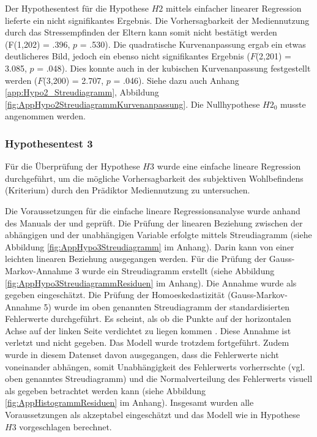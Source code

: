 Der Hypothesentest für die Hypothese $H2$ mittels einfacher linearer Regression lieferte ein nicht signifikantes Ergebnis. Die Vorhersagbarkeit der Mediennutzung durch das Stressempfinden der Eltern kann somit nicht bestätigt werden (F(1,202) = .396, $p$ = .530). Die quadratische Kurvenanpassung ergab ein etwas deutlicheres Bild, jedoch ein ebenso nicht signifikantes Ergebnis ($F$(2,201) = 3.085, $p$ = .048). Dies konnte auch in der kubischen Kurvenanpassung festgestellt werden ($F$(3,200) = 2.707, $p$ = .046). Siehe dazu auch Anhang \ref{app:Hypo2_Streudiagramm}, Abbildung \ref{fig:AppHypo2StreudiagrammKurvenanpassung}. Die Nullhypothese $H2_{0}$ musste angenommen werden.

\subsubsection{Hypothesentest 3}
Für die Überprüfung der Hypothese $H3$ wurde eine einfache lineare Regression durchgeführt, um die mögliche Vorhersagbarkeit des subjektiven Wohlbefindens (Kriterium) durch den Prädiktor Mediennutzung zu untersuchen.

Die Voraussetzungen für die einfache lineare Regressionsanalyse wurde anhand des Manuals der  und  geprüft. Die Prüfung der linearen Beziehung zwischen der abhängigen und der unabhängigen Variable erfolgte mittels Streudiagramm (siehe Abbildung \ref{fig:AppHypo3Streudiagramm} im Anhang). Darin kann von einer leichten linearen Beziehung ausgegangen werden. Für die Prüfung der Gauss-Markov-Annahme 3 wurde ein Streudiagramm erstellt (siehe Abbildung \ref{fig:AppHypo3StreudiagrammResiduen} im Anhang). Die Annahme wurde als gegeben eingeschätzt. Die Prüfung der Homoeskedastizität (Gauss-Markov-Annahme 5) wurde im oben genannten Streudiagramm der standardisierten Fehlerwerte durchgeführt. Es scheint, als ob die Punkte auf der horizontalen Achse auf der linken Seite verdichtet zu liegen kommen \cite{Hemmerich2018}. Diese Annahme ist verletzt und nicht gegeben. Das Modell wurde trotzdem fortgeführt. Zudem wurde in diesem Datenset davon ausgegangen, dass die Fehlerwerte nicht voneinander abhängen, somit Unabhängigkeit des Fehlerwerts vorherrschte (vgl. oben genanntes Streudiagramm) und die Normalverteilung des Fehlerwerts visuell als gegeben betrachtet werden kann (siehe Abbildung \ref{fig:AppHistogrammResiduen} im Anhang). Insgesamt wurden alle Voraussetzungen als akzeptabel eingeschätzt und das Modell wie in Hypothese $H3$ vorgeschlagen berechnet.

